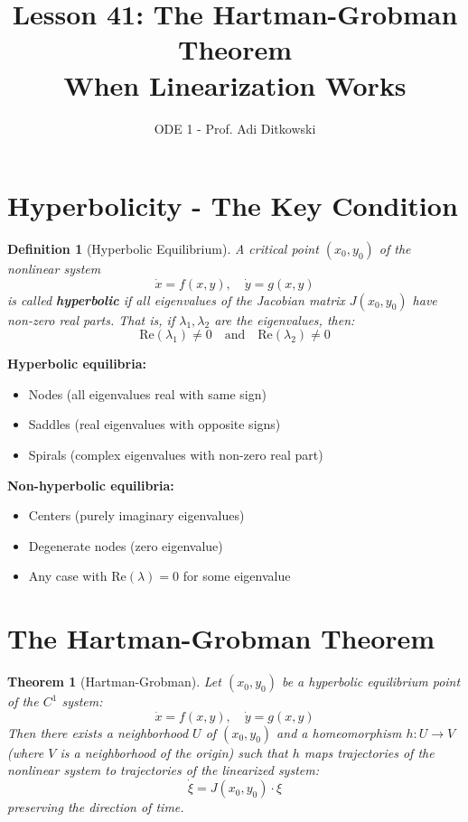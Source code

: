 \documentclass[12pt]{article}
\title{Lesson 41: The Hartman-Grobman Theorem\\
\large When Linearization Works}
\author{ODE 1 - Prof. Adi Ditkowski}
\date{}
\newtheorem{definition}{Definition}
\newtheorem{theorem}{Theorem}
\begin{document}
\maketitle

\section{Hyperbolicity - The Key Condition}

\begin{definition}[Hyperbolic Equilibrium]
A critical point $(x_0, y_0)$ of the nonlinear system
$$\dot{x} = f(x,y), \quad \dot{y} = g(x,y)$$
is called \textbf{hyperbolic} if all eigenvalues of the Jacobian matrix $J(x_0, y_0)$ have non-zero real parts. That is, if $\lambda_1, \lambda_2$ are the eigenvalues, then:
$$\text{Re}(\lambda_1) \neq 0 \quad \text{and} \quad \text{Re}(\lambda_2) \neq 0$$
\end{definition}

\begin{keypoint}
\textbf{Hyperbolic equilibria:}
\begin{itemize}
    \item Nodes (all eigenvalues real with same sign)
    \item Saddles (real eigenvalues with opposite signs)
    \item Spirals (complex eigenvalues with non-zero real part)
\end{itemize}
\textbf{Non-hyperbolic equilibria:}
\begin{itemize}
    \item Centers (purely imaginary eigenvalues)
    \item Degenerate nodes (zero eigenvalue)
    \item Any case with $\text{Re}(\lambda) = 0$ for some eigenvalue
\end{itemize}
\end{keypoint}

\section{The Hartman-Grobman Theorem}

\begin{theorem}[Hartman-Grobman]
Let $(x_0, y_0)$ be a hyperbolic equilibrium point of the $C^1$ system:
$$\dot{x} = f(x,y), \quad \dot{y} = g(x,y)$$
Then there exists a neighborhood $U$ of $(x_0, y_0)$ and a homeomorphism $h: U \to V$ (where $V$ is a neighborhood of the origin) such that $h$ maps trajectories of the nonlinear system to trajectories of the linearized system:
$$\dot{\xi} = J(x_0, y_0) \cdot \xi$$
preserving the direction of time.
\end{theorem}
\end{document}
